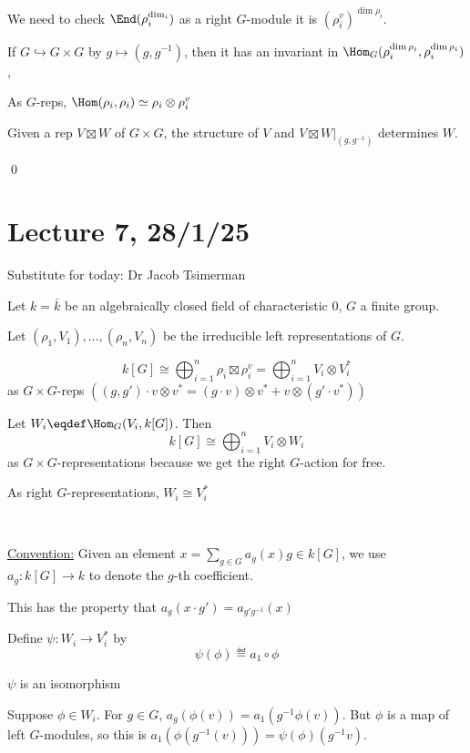 \documentclass[x11names,reqno,14pt]{extarticle}
\newcommand{\bark}{\bar{k}}
\newcommand{\into}{\hookrightarrow}
\begin{document}
We need to check $\End(\rho_i^{\dim_i})$ as a right $G$-module it is $(\rho_i^v)^{\dim \rho_i}$.

If $G \into G\times G$ by $g\mapsto (g, g^{-1})$, then it has an invariant in $\Hom_G(\rho_i^{\dim \rho_i},\rho_i^{\dim\rho_i})$, 

As $G$-reps, $\Hom(\rho_i,\rho_i) \simeq \rho_i\otimes\rho_i^v$

\claim

Given a rep $V\boxtimes W$ of $G\times G$, the structure of $V$ and $V\boxtimes W|_{(g, g^{-1})}$ determines $W$.

\proof

\qed

\section*{Lecture 7, 28/1/25}

Substitute for today: Dr Jacob Tsimerman

Let $k = \bark$ be an algebraically closed field of characteristic $0$, $G$ a finite group. 

Let $(\rho_1,V_1), \dots, (\rho_n,V_n)$ be the irreducible left representations of $G$. 

\thm
\[
k[G] \cong \bigoplus_{i=1}^n\rho_i\boxtimes\rho_i^v = \bigoplus_{i=1}^nV_i\otimes V_i^*
\]
as $G\times G$-reps $((g,g')\cdot v\otimes v^* = (g\cdot v)\otimes v^* + v\otimes (g'\cdot v^*))$

\proof

Let $W_i \eqdef \Hom_G(V_i, k[G])$. Then 
\[
k[G] \cong \bigoplus_{i=1}^nV_i\otimes W_i
\]
as $G\times G$-representations because we get the right $G$-action for free. 

\claim

As right $G$-representations, $W_i \cong V_i^*$

\proof
\,

\underline{Convention:} Given an element $x = \sum_{g\in G}a_g(x)g \in k[G]$, we use $a_g:k[G] \to k$ to denote the $g$-th coefficient. 

This has the property that $a_g(x\cdot g') = a_{g'g^{-1}}(x)$

Define $\psi:W_i \to V_i^*$ by 
\[
\psi(\phi)\eqdef a_1\circ\phi
\]

\claim

$\psi$ is an isomorphism

\proof

Suppose $\phi\in W_i$. For $g \in G$, $a_g(\phi(v)) = a_1(g^{-1}\phi(v))$. But $\phi$ is a map of left $G$-modules, so this is $a_1(\phi(g^{-1}(v))) = \psi(\phi)(g^{-1}v)$. 
\end{document}
